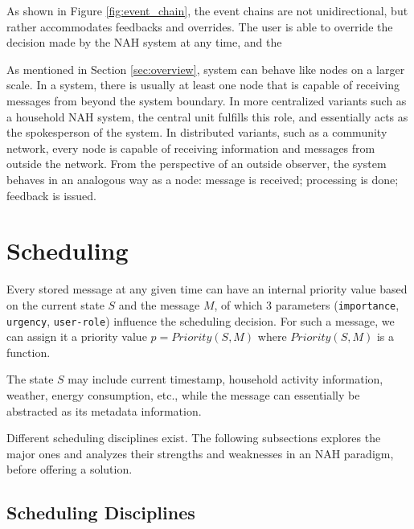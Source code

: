 \documentclass[letterpaper, twocolumn, 10pt, conference]{IEEEtran}
\newcommand{\term}[1]{\textbf{#1}}
\newcommand{\mono}[1]{\texttt{#1}}
\begin{document}
As shown in Figure \ref{fig:event_chain}, the event chains are not unidirectional, but rather accommodates feedbacks and overrides. The user is able to override the decision made by the NAH system at any time, and the 

As mentioned in Section \ref{sec:overview}, system can behave like nodes on a larger scale. In a system, there is usually at least one node that is capable of receiving messages from beyond the system boundary. In more centralized variants such as a household NAH system, the central unit fulfills this role, and essentially acts as the spokesperson of the system. In distributed variants, such as a community network, every node is capable of receiving information and messages from outside the network. From the perspective of an outside observer, the system behaves in an analogous way as a node: message is received; processing is done; feedback is issued. 

\section{Scheduling} \label{sec:scheduling}

Every stored message at any given time can have an internal priority value based on the current state $S$ and the message $M$, of which 3 parameters (\mono{importance}, \mono{urgency}, \mono{user-role}) influence the scheduling decision. For such a message, we can assign it a priority value $p=Priority(S, M)$ where $Priority(S, M)$ is a function. 

The state $S$ may include current timestamp, household activity information, weather, energy consumption, etc., while the message can essentially be abstracted as its metadata information.

Different scheduling disciplines exist. The following subsections explores the major ones and analyzes their strengths and weaknesses in an NAH paradigm, before offering a solution.

\subsection{Scheduling Disciplines} \label{ssec:scheduling_disciplines}

%
\end{document}
